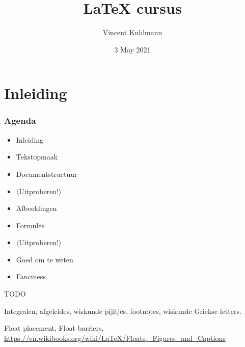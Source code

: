 

\title{\LaTeX{} cursus}
\author{Vincent Kuhlmann}
\date{3 May 2021}



\section{Inleiding}

\begin{frame}
	\titlepage
	\centering
\end{frame}


\begin{frame}
	\frametitle{Agenda}
	
	\begin{itemize}
		\item Inleiding
		\item Tekstopmaak
		\item Documentstructuur
		\item $ \langle $Uitproberen!$ \rangle $
		\item Afbeeldingen
		\item Formules
		\item $ \mathbf\langle $Uitproberen!$ \rangle $
		\item Goed om te weten
		\item Fanciness
	\end{itemize}
\end{frame}

\begin{frame}
	TODO
	
	Integralen, afgeleides, wiskunde pijltjes, footnotes, wiskunde Griekse letters.

	Float placement, Float barriers, \url{https://en.wikibooks.org/wiki/LaTeX/Floats,_Figures_and_Captions}
\end{frame}













